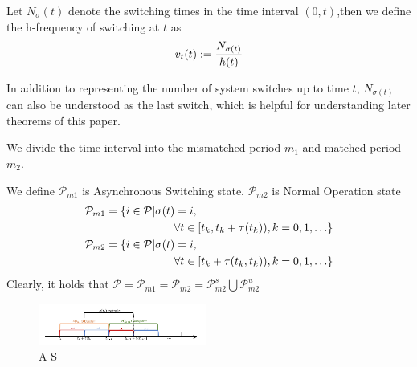 \documentclass[twocolumn]{autart}    %
\begin{document}
\begin{defn}
    Let $N_{\sigma}(t)$ denote the switching times in the time interval $(0,t)$,then we define the h-frequency of switching at $t$ as
    \begin{equation}
        \begin{aligned}
            \setlength{\arraycolsep}{0.9pt}
            v_{t}(t) := \frac{N_{\sigma(t)}}{h(t)}
        \end{aligned}
    \end{equation}
\end{defn}

\begin{rmk}
    In addition to representing the number of system switches up to time $t$, $N_{\sigma(t)}$ can also be understood as the last switch, which is helpful for understanding later theorems of this paper.
\end{rmk}


\begin{defn}
We divide the time interval into the mismatched period $m_{1}$ and matched period $m_{2}$.

We define $\mathcal{P}_{m1}$ is Asynchronous Switching state. $\mathcal{P}_{m2}$ is Normal Operation state
\begin{equation}
    \begin{aligned}
        \setlength{\arraycolsep}{0.9pt}
        &\mathcal{P}_{m1} = \{i \in \mathcal{P} | \sigma(t) = i,\\
        &\qquad \qquad \qquad \qquad  \forall t \in [t_{k},t_{k}+\tau(t_{k})),k = 0,1,\ldots\}\\
        &\mathcal{P}_{m2} = \{i \in \mathcal{P} | \sigma(t) = i,\\
        &\qquad \qquad \qquad \qquad\forall t \in [t_{k}+\tau(t_{k},t_{k})),k = 0,1,\ldots\}
    \end{aligned}
\end{equation}
Clearly, it holds that $\mathcal{P} = \mathcal{P}_{m1} = \mathcal{P}_{m2} = \mathcal{P}_{m2}^{s}\bigcup \mathcal{P}_{m2}^{u}$
\end{defn}

\begin{figure}[htbp]
    \centering
    \includegraphics[width=0.49\textwidth,height=0.121\textwidth]{2_1.png}
    \caption{A S}
    \end{figure} 
\end{document}

